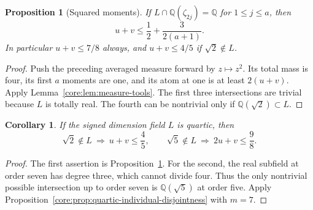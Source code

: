 \documentclass[11pt,a4paper]{article}
\newtheorem{proposition}[theorem]{Proposition}
\newtheorem{corollary}[theorem]{Corollary}
\theoremstyle{definition}\newtheorem{definition}[theorem]{Definition}
\theoremstyle{remark}\newtheorem{remark}[theorem]{Remark}
\newcommand{\Q}{\mathbb Q}
\numberwithin{equation}{section}
\begin{document}
\begin{proposition}[Squared moments]\label{core:squared-moments}
If $L\cap\Q(\zeta_{2j})=\Q$ for $1\le j\le a$, then
\[
u+v\le\frac12+\frac{3}{2(a+1)}.
\]
In particular $u+v\le7/8$ always, and $u+v\le4/5$ if
$\sqrt2\notin L$.
\end{proposition}
\begin{proof}
Push the preceding averaged measure forward by $z\mapsto z^2$.
Its total mass is four, its first $a$ moments are one, and its atom
at one is at least $2(u+v)$. Apply Lemma~\ref{core:lem:measure-tools}. The first three
intersections are trivial because $L$ is totally real. The fourth
can be nontrivial only if $\Q(\sqrt2)\subset L$.
\end{proof}
\begin{corollary}\label{core:quartic-short-moments}
If the signed dimension field $L$ is quartic, then
\[
 \sqrt2\notin L\ \Longrightarrow\ u+v\le\frac45,
 \qquad
 \sqrt5\notin L\ \Longrightarrow\ 2u+v\le\frac98.
\]
\end{corollary}
\begin{proof}
The first assertion is Proposition~\ref{core:squared-moments}.
For the second, the real subfield at order seven has degree three,
which cannot divide four. Thus the only nontrivial possible
intersection up to order seven is $\Q(\sqrt5)$ at order five. Apply
Proposition~\ref{core:prop:quartic-individual-disjointness} with $m=7$.
\end{proof}
\end{document}
